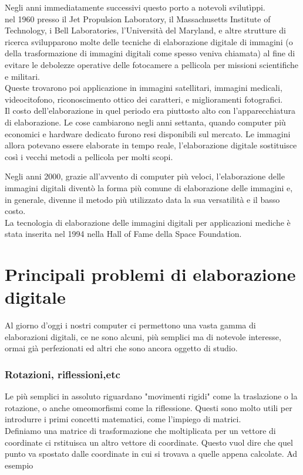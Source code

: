 Negli anni immediatamente successivi questo porto a notevoli svilutìppi.\\
\vspace{1em}
nel 1960 presso il Jet Propulsion Laboratory, il Massachusetts Institute of Technology, i Bell Laboratories, l'Università del Maryland, e altre strutture di ricerca svilupparono molte delle tecniche di elaborazione digitale di immagini (o della trasformazione di immagini digitali come spesso veniva chiamata) al fine di evitare le debolezze operative delle fotocamere a pellicola per missioni scientifiche e militari.\\
Queste trovarono poi applicazione in immagini satellitari, immagini medicali, videocitofono, riconoscimento ottico dei caratteri, e miglioramenti fotografici.\\

Il costo dell'elaborazione in quel periodo era piuttosto alto con l'apparecchiatura di elaborazione. Le cose cambiarono negli anni settanta, quando computer più economici e hardware dedicato furono resi disponibili sul mercato. 
Le immagini allora potevano essere elaborate in tempo reale, l'elaborazione digitale sostituisce così i vecchi metodi a pellicola per molti scopi.\\
\vspace{1em}

Negli anni 2000, grazie all'avvento di computer più veloci, l'elaborazione delle immagini digitali diventò la forma più comune di elaborazione delle immagini e, in generale, divenne il metodo più utilizzato data la sua versatilità e il basso costo.\\

La tecnologia di elaborazione delle immagini digitali per applicazioni mediche è stata inserita nel 1994 nella Hall of Fame della Space Foundation.\\


\section{Principali problemi di elaborazione digitale}

Al giorno d'oggi i nostri computer ci permettono una vasta gamma di elaborazioni digitali, ce ne sono alcuni, più semplici ma di notevole interesse, ormai già perfezionati ed altri che sono ancora oggetto di studio.

\subsubsection{Rotazioni, riflessioni,etc}
Le più semplici in assoluto riguardano "movimenti rigidi" come la traslazione o la rotazione, o anche omeomorfismi come la riflessione. Questi sono molto utili per introdurre i primi concetti matematici, come l'impiego di matrici.\\
Definiamo una matrice di trasformazione che moltiplicata per un vettore di coordinate ci rstituisca un altro vettore di coordinate. Questo vuol dire che quel punto va spostato dalle coordinate in cui si trovava a quelle appena calcolate. Ad esempio  

